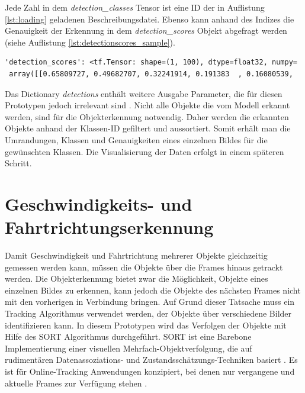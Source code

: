 Jede Zahl in dem \emph{detection\_classes} Tensor ist eine ID der in Auflistung \ref{lst:loading} geladenen Beschreibungsdatei. Ebenso kann anhand des Indizes die Genauigkeit der Erkennung in dem \emph{detection\_scores} Objekt abgefragt werden (siehe Auflistung \ref{lst:detectionscores_sample}).

\vspace*{5mm}
\begin{lstlisting}[caption={Beispielausschnitt der detection scores}, label={lst:detectionscores_sample}]
'detection_scores': <tf.Tensor: shape=(1, 100), dtype=float32, numpy=
 array([[0.65809727, 0.49682707, 0.32241914, 0.191383  , 0.16080539,
\end{lstlisting}

Das Dictionary \emph{detections} enthält weitere Ausgabe Parameter, die für diesen Prototypen jedoch irrelevant sind \cite{efficientdet}. Nicht alle Objekte die vom Modell erkannt werden, sind für die Objekterkennung notwendig. Daher werden die erkannten Objekte anhand der Klassen-ID gefiltert und aussortiert. Somit erhält man die Umrandungen, Klassen und Genauigkeiten eines einzelnen Bildes für die gewünschten Klassen. Die Visualisierung der Daten erfolgt in einem späteren Schritt. 
\newpage
\section{Geschwindigkeits- und Fahrtrichtungserkennung}

Damit Geschwindigkeit und Fahrtrichtung mehrerer Objekte gleichzeitig gemessen werden kann, müssen die Objekte über die Frames hinaus getrackt werden. Die Objekterkennung bietet zwar die Möglichkeit, Objekte eines einzelnen Bildes zu erkennen, kann jedoch die Objekte des nächsten Frames nicht mit den vorherigen in Verbindung bringen. Auf Grund dieser Tatsache muss ein Tracking Algorithmus verwendet werden, der Objekte über verschiedene Bilder identifizieren kann. In diesem Prototypen wird das Verfolgen der Objekte mit Hilfe des \acs{SORT} Algorithmus durchgeführt. \ac{SORT} ist eine Barebone Implementierung einer visuellen Mehrfach-Objektverfolgung, die auf rudimentären Datenassoziations- und Zustandsschätzungs-Techniken basiert \cites{sort_gh}{DBLP:journals/corr/BewleyGORU16}. Es ist für Online-Tracking Anwendungen konzipiert, bei denen nur vergangene und aktuelle Frames zur Verfügung stehen \cite{sort_gh}.

